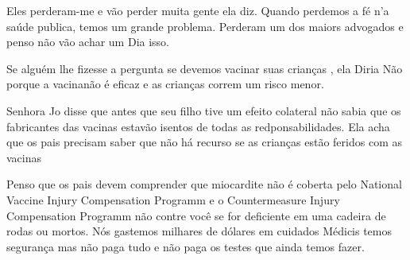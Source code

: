 Eles perderam-me e vão perder muita gente ela diz. Quando perdemos a fé n'a
saúde publica, temos um grande problema. Perderam um dos maiors advogados e
penso não vão achar um Dia isso.

Se alguém lhe fizesse a pergunta se devemos vacinar suas crianças , ela Diria
Não porque a vacinanão é eficaz e as crianças correm um risco menor.

Senhora Jo disse que antes que seu filho tive um efeito colateral não sabia que
os fabricantes das vacinas estavão isentos de todas as redponsabilidades. Ela
acha que os pais precisam saber que não há recurso se as crianças estão feridos
com as vacinas

Penso que os pais devem comprender que miocardite não é coberta pelo National
Vaccine Injury Compensation Programm e o Countermeasure Injury Compensation
Programm não contre você se for deficiente em uma cadeira de rodas ou mortos.
Nós gastemos milhares de dólares em cuidados Médicis temos segurança mas não
paga tudo e não paga os testes que ainda temos fazer.
